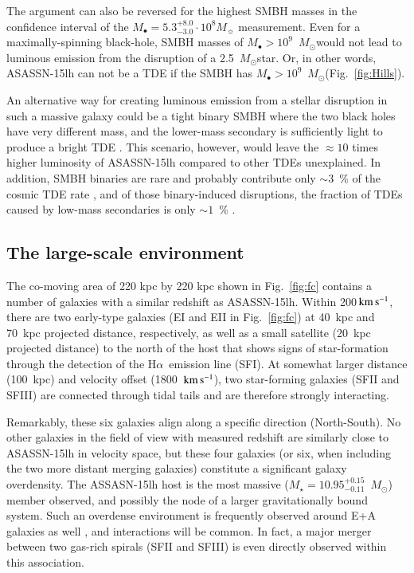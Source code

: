 \documentclass[traditabstract]{aa}
\newcommand{\kms}{$\rm{km\,s^{-1}}$}
\newcommand{\ha}{H$\alpha$}
\newcommand{\Msun}{$M_\odot$}
\begin{document}
The argument can also be reversed for the highest SMBH masses in the confidence interval of the $M_\bullet = 5.3_{-3.0}^{+8.0}\cdot10^{8} M_\sun$ measurement. Even for a maximally-spinning black-hole, SMBH masses of $M_\bullet>10^9$~\Msun would not lead to luminous emission from the disruption of a 2.5~\Msun star. Or, in other words, ASASSN-15lh can not be a TDE if the SMBH has $M_\bullet>10^9$~\Msun (Fig.~\ref{fig:Hills}).

An alternative way for creating luminous emission from a stellar disruption in such a massive galaxy could be a tight binary SMBH where the two black holes have very different mass, and the lower-mass secondary is sufficiently light to produce a bright TDE \citep{2017arXiv170504689C}. This scenario, however, would leave the $\approx 10$ times higher luminosity of ASASSN-15lh compared to other TDEs unexplained. In addition, SMBH binaries are rare and probably contribute only $\sim 3$~\% of the cosmic TDE rate \citep{2011ApJ...738L...8W}, and of those binary-induced disruptions, the fraction of TDEs caused by low-mass secondaries is only $\sim1$~\% \citep{2013PhDT.........2W}.


\subsection{The large-scale environment}

The co-moving area of 220 kpc by 220 kpc shown in Fig.~\ref{fig:fc} contains a number of galaxies with a similar redshift as ASASSN-15lh. Within 200\,\kms, there are two early-type galaxies (EI and EII in Fig.~\ref{fig:fc}) at 40~kpc and 70~kpc projected distance, respectively, as well as a small satellite (20~kpc projected distance) to the north of the host that shows signs of star-formation through the detection of the \ha~emission line (SFI). At somewhat larger distance (100~kpc) and velocity offset (1800~\kms), two star-forming galaxies (SFII and SFIII) are connected through tidal tails and are therefore strongly interacting.

Remarkably, these six galaxies align along a specific direction (North-South). No other galaxies in the field of view with measured redshift are similarly close to ASASSN-15lh in velocity space, but these four galaxies (or six, when including the two more distant merging galaxies) constitute a significant galaxy overdensity. The ASSASN-15lh host is the most massive ($M_\star = 10.95^{+0.15}_{-0.11}$~\Msun) member observed, and possibly the node of a larger gravitationally bound system. Such an overdense environment is frequently observed around E+A galaxies as well \citep{2005MNRAS.357..937G}, and interactions will be common. In fact, a major merger between two gas-rich spirals (SFII and SFIII) is even directly observed within this association.
\end{document}
